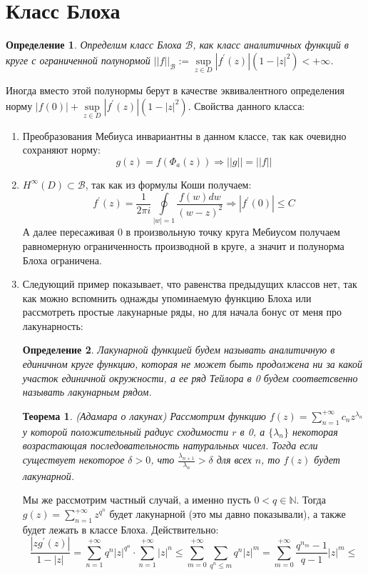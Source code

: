 \documentclass[12pt,a4paper]{article} %
\newtheorem{theorem}{Теорема}
\newtheorem{definition}{Определение}
\begin{document}
	\section{Класс Блоха}
	\begin{definition}
		Определим класс Блоха $\mathcal{B}$, как класс аналитичных функций в круге с ограниченной полунормой $||f||_{\mathcal{B}}:=\sup\limits_{z\in D}|f^{'}(z)|(1-|z|^2)<+\infty$.
	\end{definition}
	Иногда вместо этой полунормы берут в качестве эквивалентного определения норму $|f(0)|+\sup\limits_{z\in D}|f^{'}(z)|(1-|z|^2)$.
	Свойства данного класса:
	\begin{enumerate}
		\item Преобразования Мебиуса инвариантны в данном классе, так как очевидно сохраняют норму:
		$$g(z)=f(\Phi_a(z))\Rightarrow||g||=||f||$$
		\item $H^{\infty}(D)\subset\mathcal{B}$, так как из формулы Коши получаем:
		$$f^{'}(z)=\frac{1}{2\pi i}\oint\limits_{|w|=1}\frac{f(w)dw}{(w-z)^2}\Rightarrow|f^{'}(0)|\leq C$$
		А далее пересаживая 0 в произвольную точку круга Мебиусом получаем равномерную ограниченность производной в круге, а значит и полунорма Блоха ограничена.
		\item Следующий пример показывает, что равенства предыдущих классов нет, так как можно вспомнить однажды упоминаемую функцию Блоха или рассмотреть простые лакунарные ряды, но для начала бонус от меня про лакунарность:
		\begin{definition}
			Лакунарной функцией будем называть аналитичную в единичном круге функцию, которая не может быть продолжена ни за какой участок единичной окружности, а ее ряд Тейлора в 0 будем соответсвенно называть лакунарным рядом.
		\end{definition}
		\begin{theorem}
			(Адамара о лакунах) Рассмотрим функцию $f(z)=\sum_{n=1}^{+\infty}c_nz^{\lambda_n}$ у которой положительный радиус сходимости $r$ в 0, а $\{\lambda_n\}$ некоторая возрастающая последовательность натуральных чисел. Тогда если существует некоторое $\delta>0$, что $\frac{\lambda_{n+1}}{\lambda_n}>\delta$ для всех $n$, то $f(z)$ будет лакунарной.
		\end{theorem}
		Мы же рассмотрим частный случай, а именно пусть $0<q\in\mathbb{N}$. Тогда\\ $g(z)=\sum_{n=1}^{+\infty}z^{q^n}$ будет лакунарной (это мы давно показывали), а также будет лежать в классе Блоха. Действительно:
		$$\frac{|zg^{'}(z)|}{1-|z|}=\sum_{n=1}^{+\infty}q^n|z|^{q^n}\cdot\sum_{n=1}^{+\infty}|z|^n\leq\sum_{m=0}^{+\infty}\sum_{q^n\leq m}q^n|z|^m=\sum_{m=0}^{+\infty}\frac{q^{n_m}-1}{q-1}|z|^m\leq$$

\end{enumerate}
\end{document}
